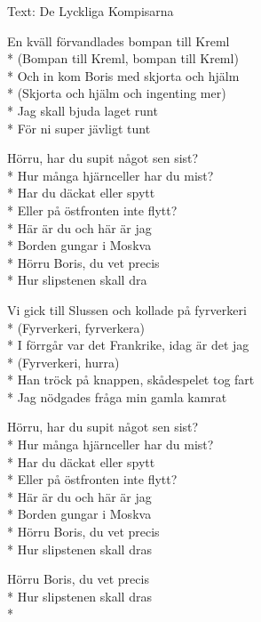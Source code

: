 \begin{SongText}
    \begin{SongInfo}
        Text: De Lyckliga Kompisarna
    \end{SongInfo}
    \begin{SongVerse}
        En kväll förvandlades bompan till Kreml\\*%
        (Bompan till Kreml, bompan till Kreml)\\*%
        Och in kom Boris med skjorta och hjälm\\*%
        (Skjorta och hjälm och ingenting mer)\\*%
        Jag skall bjuda laget runt\\*%
        För ni super jävligt tunt
    \end{SongVerse}
    \begin{SongVerse}
        Hörru, har du supit något sen sist?\\*%
        Hur många hjärnceller har du mist?\\*%
        Har du däckat eller spytt\\*%
        Eller på östfronten inte flytt?\\*%
        Här är du och här är jag\\*%
        Borden gungar i Moskva\\*%
        Hörru Boris, du vet precis\\*%
        Hur slipstenen skall dra
    \end{SongVerse}
    \begin{SongVerse}
        Vi gick till Slussen och kollade på fyrverkeri\\*%
        (Fyrverkeri, fyrverkera)\\*%
        I förrgår var det Frankrike, idag är det jag\\*%
        (Fyrverkeri, hurra)\\*%
        Han tröck på knappen, skådespelet tog fart\\*%
        Jag nödgades fråga min gamla kamrat
    \end{SongVerse}
    \begin{SongVerse}
        Hörru, har du supit något sen sist?\\*%
        Hur många hjärnceller har du mist?\\*%
        Har du däckat eller spytt\\*%
        Eller på östfronten inte flytt?\\*%
        Här är du och här är jag\\*%
        Borden gungar i Moskva\\*%
        Hörru Boris, du vet precis\\*%
        Hur slipstenen skall dras
    \end{SongVerse}
    \begin{SongVerse}
        Hörru Boris, du vet precis\\*%
        Hur slipstenen skall dras\\*%
    \end{SongVerse}
\end{SongText}

